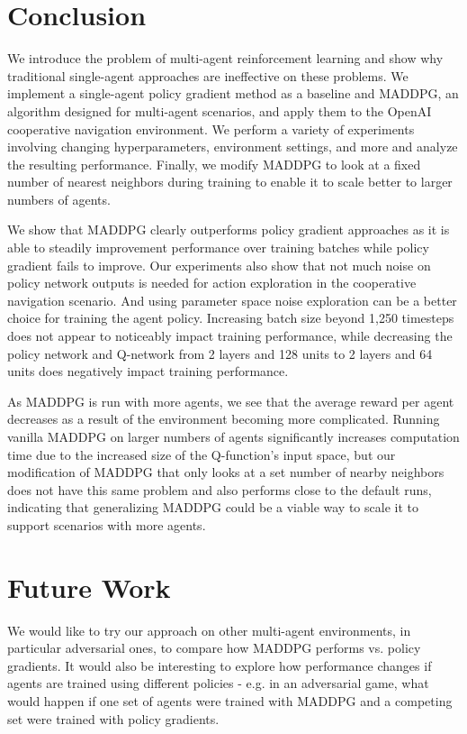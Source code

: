 \documentclass{article}
\begin{document}
\section{Conclusion}

We introduce the problem of multi-agent reinforcement learning and show why traditional single-agent approaches are ineffective on these problems. We implement a single-agent policy gradient method as a baseline and MADDPG, an algorithm designed for multi-agent scenarios, and apply them to the OpenAI cooperative navigation environment. We perform a variety of experiments involving changing hyperparameters, environment settings, and more and analyze the resulting performance. Finally, we modify MADDPG to look at a fixed number of nearest neighbors during training to enable it to scale better to larger numbers of agents.

We show that MADDPG clearly outperforms policy gradient approaches as it is able to steadily improvement performance over training batches while policy gradient fails to improve. Our experiments also show that not much noise on policy network outputs is needed for action exploration in the cooperative navigation scenario. And using parameter space noise exploration can be a better choice for training the agent policy. Increasing batch size beyond 1,250 timesteps does not appear to noticeably impact training performance, while decreasing the policy network and Q-network from 2 layers and 128 units to 2 layers and 64 units does negatively impact training performance.

As MADDPG is run with more agents, we see that the average reward per agent decreases as a result of the environment becoming more complicated. Running vanilla MADDPG on larger numbers of agents significantly increases computation time due to the increased size of the Q-function's input space, but our modification of MADDPG that only looks at a set number of nearby neighbors does not have this same problem and also performs close to the default runs, indicating that generalizing MADDPG could be a viable way to scale it to support scenarios with more agents.


\section{Future Work}
We would like to try our approach on other multi-agent environments, in particular adversarial ones, to compare how MADDPG performs vs. policy gradients. It would also be interesting to explore how performance changes if agents are trained using different policies - e.g. in an adversarial game, what would happen if one set of agents were trained with MADDPG and a competing set were trained with policy gradients.
\end{document}
